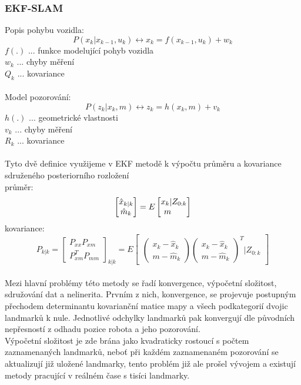 \documentclass[11pt]{article}
\begin{document}
\subsubsection{EKF-SLAM}
Popis pohybu vozidla:
$$P(x_k|x_{k-1},u_k)\leftrightarrow x_k=f(x_{k-1},u_k)+w_k$$
$f(.)$ ... funkce modelující pohyb vozidla\\
$w_k$ ... chyby měření\\
$Q_k$ ... kovariance\\
\\
Model pozorování:
$$P(z_k|x_k,m)\leftrightarrow z_k=h(x_k,m)+v_k $$
$h(.)$ ... geometrické vlastnosti\\
$v_k$ ... chyby měření\\
$R_k$ ... kovariance\\
\\
Tyto dvě definice využijeme v EKF metodě k výpočtu průměru a kovariance sdruženého posteriorního rozložení\\
\indent průměr:
$$\begin{bmatrix}
\hat{x}_{k|k}\\\hat{m}_k
\end{bmatrix}=E
\begin{bmatrix}
x_k |Z_{0:k}\\m\indent
\end{bmatrix}$$ 
\indent kovariance:
$$P_{k|k}=\begin{bmatrix}
P_{xx} P_{xm}\\P^T_{xm} P_{mm}
\end{bmatrix}_{k|k}=E\begin{bmatrix}
\begin{pmatrix}
x_k-\hat{x}_k\\m-\hat{m}_k
\end{pmatrix} \begin{pmatrix}
x_k-\hat{x}_k\\m-\hat{m}_k
\end{pmatrix}^T |Z_{0:k}
\end{bmatrix}$$\\
Mezi hlavní problémy této metody se řadí konvergence, výpočetní složitost, sdružování dat a nelinerita. Prvním z nich, konvergence, se projevuje postupným přechodem determinantu kovarianční matice mapy a všech podkategorií dvojic landmarků k nule. Jednotlivé odchylky landmarků pak konvergují dle původních nepřesností z odhadu pozice robota a jeho pozorování.\\
\indent Výpočetní složitost je zde brána jako kvadraticky rostoucí s počtem zaznamenaných landmarků, neboť při každém zaznamenaném pozorování se aktualizují již uložené landmarky, tento problém již ale prošel vývojem a existují metody pracující v reálném čase s tisíci landmarky.\\
\end{document}
